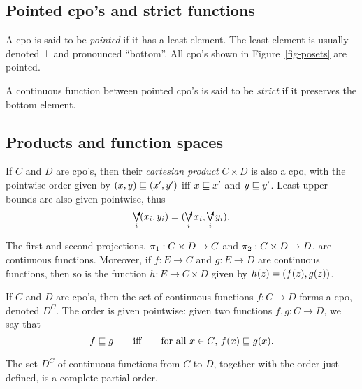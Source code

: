 \documentclass{article}
\begin{document}
\subsection{Pointed cpo's and strict functions}

\begin{definition}
  A cpo is said to be {\em pointed} if it has a least element. The
  least element is usually denoted $\bot$ and pronounced ``bottom''.
  All cpo's shown in Figure~\ref{fig-posets} are pointed.

  A continuous function between pointed cpo's is said to be {\em
  strict} if it preserves the bottom element.
\end{definition}

\subsection{Products and function spaces}

If $C$ and $D$ are cpo's, then their {\em cartesian product} $C\times
D$ is also a cpo, with the pointwise order given by
$(x,y)\sqsubseteq(x',y')$ iff $x\sqsubseteq x'$ and $y\sqsubseteq y'$.
Least upper bounds are also given pointwise, thus
\[ \dirsup_i\rpair{x_i,y_i} = \rpair{\dirsup_i x_i,\dirsup_i y_i}.
\]

\begin{proposition}\label{prop-cpo-products}
  The first and second projections, $\pi_1:C\times D\to C$ and
  $\pi_2:C\times D\to D$, are continuous functions. Moreover, if
  $f:E\to C$ and $g:E\to D$ are continuous functions, then so is the
  function $h:E\to C\times D$ given by $h(z)=(f(z),g(z))$.
\end{proposition}

If $C$ and $D$ are cpo's, then the set of continuous functions $f:C\to
D$ forms a cpo, denoted $D^C$. The order is given pointwise: given two
functions $f,g:C\to D$, we say that
\[ f\sqsubseteq g \hspace{2em}\mbox{iff}\hspace{2em} \mbox{for all $x\in C$, $f(x)\sqsubseteq
  g(x)$}.
\]

\begin{proposition}
  The set $D^C$ of continuous functions from $C$ to $D$, together with
  the order just defined, is a complete partial order.
\end{proposition}
\end{document}
